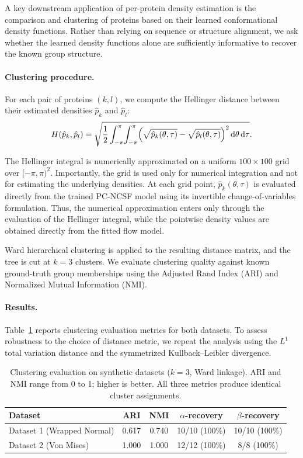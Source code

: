 \documentclass{article}
\begin{document}
{\color{red}A key downstream application of per-protein density estimation is the
comparison and clustering of proteins based on their learned conformational
density functions. Rather than relying on sequence or structure alignment, we ask whether the
learned density functions alone are sufficiently informative to recover the
known group structure.}

\paragraph{Clustering procedure.}
For each pair of proteins $(k,l)$, we compute the Hellinger distance
between their estimated densities $\hat{p}_k$ and $\hat{p}_l$:
\begin{equation}
H(\hat{p}_k,\hat{p}_l)
=
\sqrt{\frac{1}{2}
\int_{-\pi}^{\pi}\!\int_{-\pi}^{\pi}
\Bigl(\sqrt{\hat{p}_k(\theta,\tau)}
-\sqrt{\hat{p}_l(\theta,\tau)}\Bigr)^2
\,\mathrm{d}\theta\,\mathrm{d}\tau}.
\end{equation}

{\color{red}
The Hellinger integral is numerically approximated on a uniform
$100\times100$ grid over $[-\pi,\pi)^2$. Importantly, the grid is used only
for numerical integration and not for estimating the underlying densities.
At each grid point, $\hat{p}_k(\theta,\tau)$ is evaluated directly from the
trained PC-NCSF model using its invertible change-of-variables formulation.
Thus, the numerical approximation enters only through the evaluation of the
Hellinger integral, while the pointwise density values are obtained directly
from the fitted flow model.
}

Ward hierarchical clustering is applied to the resulting distance matrix,
and the tree is cut at $k=3$ clusters.
We evaluate clustering quality against known ground-truth group memberships
using the Adjusted Rand Index (ARI)
and Normalized Mutual Information (NMI).


\paragraph{Results.}
Table~\ref{tab:sim_clustering} reports clustering evaluation metrics for
both datasets.
To assess robustness to the choice of distance metric,
we repeat the analysis using the $L^1$ total variation distance and
the symmetrized Kullback--Leibler divergence.

\begin{table}[t]
\centering
\caption{Clustering evaluation on synthetic datasets ($k=3$, Ward linkage).
ARI and NMI range from 0 to 1; higher is better.
All three metrics produce identical cluster assignments.}
\label{tab:sim_clustering}
\begin{tabular}{lcccc}
\toprule
Dataset & ARI & NMI
  & $\alpha$-recovery & $\beta$-recovery \\
\midrule
Dataset 1 (Wrapped Normal) & 0.617 & 0.740
  & 10/10 (100\%) & 10/10 (100\%) \\
Dataset 2 (Von Mises)      & 1.000 & 1.000
  & 12/12 (100\%) & 8/8 (100\%) \\
\bottomrule
\end{tabular}
\end{table}
\end{document}
